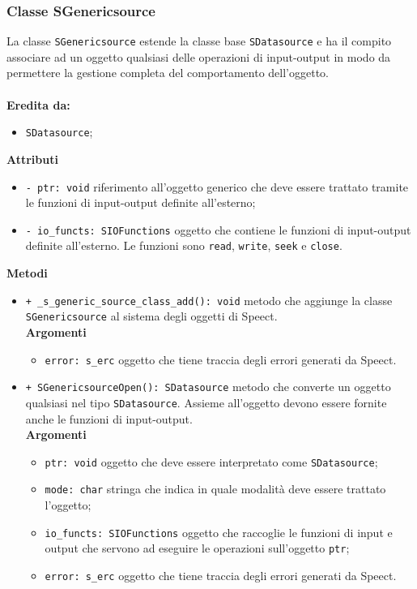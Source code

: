 \subsubsection{Classe SGenericsource}
La classe \texttt{SGenericsource} estende la classe base \texttt{SDatasource} e ha il compito associare ad un oggetto qualsiasi delle operazioni di input-output in modo da permettere la gestione completa del comportamento dell'oggetto.\\\\
\textbf{Eredita da:}
\begin{itemize}
	\item \texttt{SDatasource};
\end{itemize}
\textbf{Attributi}
\begin{itemize}
	\item \texttt{- ptr: void} riferimento all'oggetto generico che deve essere trattato tramite le funzioni di input-output definite all'esterno; 
	\item \texttt{- io\_functs: SIOFunctions} oggetto che contiene le funzioni di input-output definite all'esterno. Le funzioni sono \texttt{read}, \texttt{write}, \texttt{seek} e \texttt{close}.  
\end{itemize}
\textbf{Metodi}
\begin{itemize}
	\item \texttt{+ \_s\_generic\_source\_class\_add(): void} metodo che aggiunge la classe \texttt{SGenericsource} al sistema degli oggetti di Speect.\\
	\textbf{Argomenti}
	\begin{itemize}
		\item \texttt{error: s\_erc} oggetto che tiene traccia degli errori generati da Speect.
	\end{itemize}
	\item \texttt{+ SGenericsourceOpen(): SDatasource} metodo che converte un oggetto qualsiasi nel tipo \texttt{SDatasource}. Assieme all'oggetto devono essere fornite anche le funzioni di input-output.\\
	\textbf{Argomenti}
	\begin{itemize}
		\item \texttt{ptr: void} oggetto che deve essere interpretato come \texttt{SDatasource};
		\item \texttt{mode: char} stringa che indica in quale modalità deve essere trattato l'oggetto;
		\item \texttt{io\_functs: SIOFunctions} oggetto che raccoglie le funzioni di input e output che servono ad eseguire le operazioni sull'oggetto \texttt{ptr};
		\item \texttt{error: s\_erc} oggetto che tiene traccia degli errori generati da Speect.
	\end{itemize} 
\end{itemize}

